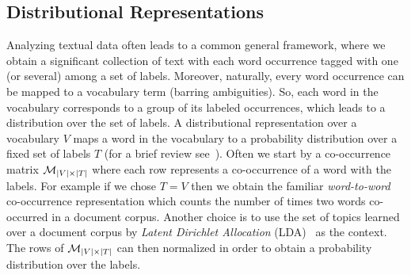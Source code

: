 \subsection{Distributional Representations}
\label{sec:distributional-representations}
Analyzing textual data often leads to a common general framework,
where we obtain a significant collection of text with each word
occurrence tagged with one (or several) among a set of
labels. Moreover, naturally, every word occurrence can be mapped to a
vocabulary term (barring ambiguities). So, each word in the vocabulary
corresponds to a group of its labeled occurrences, which leads to a
distribution over the set of labels. A distributional representation
over a vocabulary $V$ maps a word in the vocabulary to a  
probability distribution over a fixed set of labels $T$  (for a brief review
see~\cite{Turian10wordrepresentations}). Often we start by a
co-occurrence matrix ${\mathcal M}_{|V|\times|T|}$ where each row represents a
co-occurrence of a word with the labels.
For example if we chose $T=V$ then we obtain the familiar {\sl
  word-to-word} co-occurrence representation which counts the number 
of times two words co-occurred in a document corpus. Another choice is
to use the set of topics learned over a document 
corpus by {\sl Latent Dirichlet Allocation}
(LDA)~\cite{Blei:2003:LDA:944919.944937} as the context. The rows of
${\mathcal M}_{|V|\times|T|}$ 
can then normalized in order to obtain a probability distribution over
the labels.


